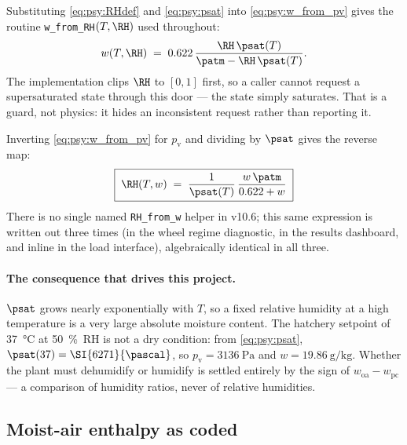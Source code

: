 Substituting \eqref{eq:psy:RHdef} and \eqref{eq:psy:psat} into \eqref{eq:psy:w_from_pv} gives the
routine \texttt{w\_from\_RH}$(T,\RH)$ used throughout:
\begin{equation}
w(T,\RH) \;=\; 0.622\,\frac{\RH\,\psat(T)}{\patm - \RH\,\psat(T)} . \label{eq:psy:w_from_RH}
\end{equation}
The implementation clips $\RH$ to $[0,1]$ first, so a caller cannot request a supersaturated state
through this door --- the state simply saturates. That is a guard, not physics: it hides an
inconsistent request rather than reporting it.

Inverting \eqref{eq:psy:w_from_pv} for $p_{\mathrm{v}}$ and dividing by $\psat$ gives the reverse
map:
\begin{equation}
\boxed{\;\RH(T,w) \;=\; \frac{1}{\psat(T)}\,\frac{w\,\patm}{0.622 + w}\;} \label{eq:psy:RH_from_w}
\end{equation}
There is no single named \texttt{RH\_from\_w} helper in v10.6; this same expression is written out
three times (in the wheel regime diagnostic, in the results dashboard, and inline in the load
interface), algebraically identical in all three.

\paragraph{The consequence that drives this project.}
$\psat$ grows nearly exponentially with $T$, so a fixed relative humidity at a high temperature is a
very large absolute moisture content. The hatchery setpoint of \SI{37}{\celsius} at
\SI{50}{\percent}~RH is not a dry condition: from \eqref{eq:psy:psat}, $\psat(37) =
\SI{6271}{\pascal}$, so $p_{\mathrm{v}} = \SI{3136}{\pascal}$ and $w =
\SI{19.86}{\gram\per\kilogram}$. Whether the plant must dehumidify or humidify is settled entirely
by the sign of $w_{\mathrm{oa}} - w_{\mathrm{pc}}$ --- a comparison of humidity ratios, never of
relative humidities.

\subsection{Moist-air enthalpy as coded}
\label{sec:psy:enthalpy}

